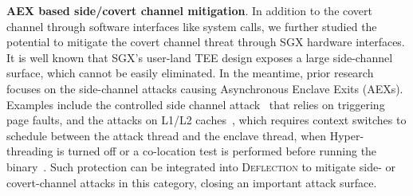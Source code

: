 \vspace{3pt}\noindent\textbf{AEX based side/covert channel mitigation}. 
In addition to the covert channel through software interfaces like system calls, we further studied the potential to mitigate the covert channel threat through SGX hardware interfaces.
It is well known that SGX's user-land TEE design exposes a large side-channel surface, which cannot be easily eliminated. In the meantime, prior research focuses on the side-channel attacks causing Asynchronous Enclave Exits (AEXs). Examples include the controlled side channel attack~\cite{xu2015controlled} that relies on triggering page faults, and the attacks on L1/L2 caches~\cite{wang2017leaky}, which requires context switches to schedule between the attack thread and the enclave thread, when Hyper-threading is turned off or a co-location test is performed before running the binary~\cite{chen2018racing}. Such protection can be integrated into \textsc{Deflection} to mitigate side- or covert-channel attacks in this category, closing an important attack surface.




